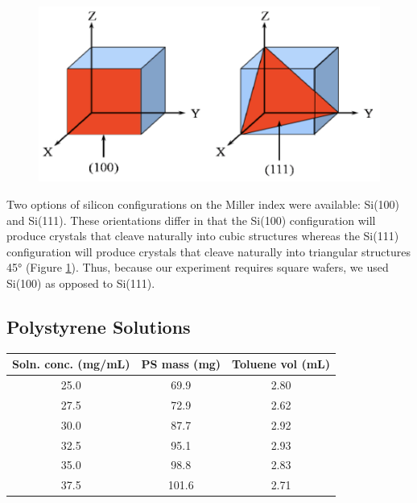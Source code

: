 \documentclass[twocolumn]{article}
\begin{document}
            \begin{figure}
                \centering
                \includegraphics[width=0.8\columnwidth]{img/silicon.png}
                \label{fig:silicon}
            \end{figure}

            Two options of silicon configurations on the Miller index were available: Si(100) and Si(111). These orientations differ in that the Si(100) configuration will produce crystals that cleave naturally into cubic structures whereas the Si(111) configuration will produce crystals that cleave naturally into triangular structures 45° (Figure \ref{fig:silicon}). Thus, because our experiment requires square wafers, we used Si(100) as opposed to Si(111).

            \subsection{Polystyrene Solutions}

                \begin{table}
                    \centering
                    \begin{tabular}{@{}ccc@{}}
                        \toprule
                        Soln. conc. (mg/mL) & PS mass (mg) & Toluene vol (mL) \\ \midrule
                        25.0                           & 69.9                  & 2.80                \\
                        27.5                           & 72.9                  & 2.62                \\
                        30.0                           & 87.7                  & 2.92                \\
                        32.5                           & 95.1                  & 2.93                \\
                        35.0                           & 98.8                  & 2.83                \\
                        37.5                           & 101.6                 & 2.71                \\ \bottomrule
                    \end{tabular}
                \end{table}
\end{document}
